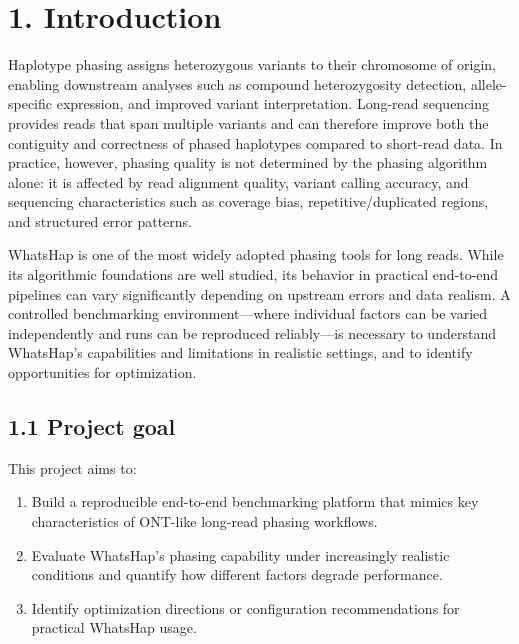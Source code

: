 \documentclass[
]{article}
\providecommand{\tightlist}{%
  \setlength{\itemsep}{0pt}\setlength{\parskip}{0pt}}
\begin{document}
\clearpage
{}
\setcounter{page}{1}

\section{1. Introduction}\label{introduction}

Haplotype phasing assigns heterozygous variants to their chromosome of
origin, enabling downstream analyses such as compound heterozygosity
detection, allele-specific expression, and improved variant
interpretation. Long-read sequencing provides reads that span multiple
variants and can therefore improve both the contiguity and correctness
of phased haplotypes compared to short-read data. In practice, however,
phasing quality is not determined by the phasing algorithm alone: it is
affected by read alignment quality, variant calling accuracy, and
sequencing characteristics such as coverage bias, repetitive/duplicated
regions, and structured error patterns.

WhatsHap is one of the most widely adopted phasing tools for long reads.
While its algorithmic foundations are well studied, its behavior in
practical end-to-end pipelines can vary significantly depending on
upstream errors and data realism. A controlled benchmarking
environment---where individual factors can be varied independently and
runs can be reproduced reliably---is necessary to understand WhatsHap's
capabilities and limitations in realistic settings, and to identify
opportunities for optimization.

\subsection{1.1 Project goal}\label{project-goal}

This project aims to:

\begin{enumerate}
\def\labelenumi{\arabic{enumi}.}
\tightlist
\item
  Build a reproducible end-to-end benchmarking platform that mimics key
  characteristics of ONT-like long-read phasing workflows.
\item
  Evaluate WhatsHap's phasing capability under increasingly realistic
  conditions and quantify how different factors degrade performance.
\item
  Identify optimization directions or configuration recommendations for
  practical WhatsHap usage.
\end{enumerate}
\end{document}
